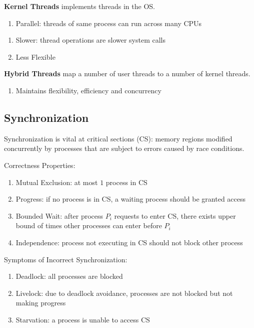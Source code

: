 \documentclass[12pt, a4paper]{article}
\begin{document}
\begin{multicols*}{3}
\textbf{Kernel Threads} implements threads in the OS.
\begin{enumerate}[$+$]
  \item Parallel: threads of same process can run across many CPUs 
\end{enumerate}\vspace{-1pt}
\begin{enumerate}[$-$]
  \item Slower: thread operations are slower system calls
  \item Less Flexible
\end{enumerate}

\textbf{Hybrid Threads} map a number of user threads to a number of kernel threads.
\begin{enumerate}[$+$]
  \item Maintains flexibility, efficiency and concurrency
\end{enumerate}

\colbreak
\subsection{Synchronization}
Synchronization is vital at critical sections (CS): memory regions modified concurrently by processes that are subject to errors caused by race conditions.

Correctness Properties:
\begin{enumerate}[\roman*.]
  \item Mutual Exclusion: at most $1$ process in CS
  \item Progress: if no process is in CS, a waiting process should be granted access 
  \item Bounded Wait: after process $P_i$ requests to enter CS, there exists upper bound of times other processes can enter before $P_i$
  \item Independence: process not executing in CS should not block other process 
\end{enumerate}

Symptoms of Incorrect Synchronization:
\begin{enumerate}[\roman*.]
  \item Deadlock: all processes are blocked
  \item Livelock: due to deadlock avoidance, processes are not blocked but not making progress 
  \item Starvation: a process is unable to access CS 
\end{enumerate}


\end{multicols*}
\end{document}
